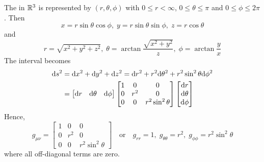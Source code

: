 \documentclass[a4paper, 10pt]{article}
\begin{document}
\begin{definition}
    The  in $\mathbb{R}^{3}$ is represented by $(r,\theta,\phi)$ with $0\leq r <\infty$, $0\leq\theta\leq\pi$ and $0\leq\phi\leq 2\pi$. Then
    \[ x = r\sin\theta\cos\phi,\; y = r\sin\theta\sin\phi,\; z = r\cos\theta \]
    and
    \[ r = \sqrt{x^{2} + y^{2} + z^{2}},\; \theta = \arctan\frac{\sqrt{x^{2}+y^{2}}}{z},\; \phi = \arctan\frac{y}{x} \]
    The interval becomes
    \begin{align*}
        \mathrm{d}{s}^{2} &= \mathrm{d}{x}^{2} + \mathrm{d}{y}^{2} + \mathrm{d}{z}^{2} = \mathrm{d}{r}^{2} + r^{2}\mathrm{d}{\theta}^{2} + r^{2}\sin^{2}\theta\mathrm{d}{\phi}^{2} \\
        &= \begin{bmatrix} \mathrm{d}{r} & \mathrm{d}{\theta} & \mathrm{d}{\phi} \end{bmatrix}\begin{bmatrix} 1 & 0 & 0 \\ 0 & r^{2} & 0 \\ 0 & 0 & r^{2}\sin^{2}\theta \end{bmatrix}\begin{bmatrix} \mathrm{d}{r} \\ \mathrm{d}{\theta} \\ \mathrm{d}{\phi} \end{bmatrix}
    \end{align*}
    Hence,
    \[ g_{\mu\nu} = \begin{bmatrix} 1 & 0 & 0 \\ 0 & r^{2} & 0 \\ 0 & 0 & r^{2}\sin^{2}\theta \end{bmatrix} \quad\text{or}\quad g_{rr} = 1,\; g_{\theta\theta} = r^{2},\; g_{\phi\phi} = r^{2}\sin^{2}\theta \]
    where all off-diagonal terms are zero.
\end{definition}
\newpage

\end{document}
